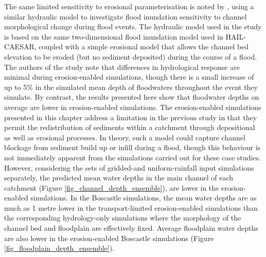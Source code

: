 The same limited sensitivity to erosional parameterisation is noted by \citep{wong2015sensitivity}, using a similar hydraulic model to investigate flood inundation sensitivity to channel morphological change during flood events. The hydraulic model used in the \citet{wong2015sensitivity} study is based on the same two-dimensional flood inundation model used in HAIL-CAESAR, coupled with a simple erosional model that allows the channel bed elevation to be eroded (but no sediment deposited) during the course of a flood. The authors of the study note that differences in hydrological response are minimal during erosion-enabled simulations, though there is a small increase of up to 5\% in the simulated mean depth of floodwaters throughout the event they simulate. By contrast, the results presented here show that floodwater depths on average are lower in erosion-enabled simulations. The erosion-enabled simulations presented in this chapter address a limitation in the previous study in that they permit the redistribution of sediments within a catchment through depositional as well as erosional processes.  In theory, such a model could capture channel blockage from sediment build up or infill during a flood, though this behaviour is not immediately apparent from the simulations carried out for these case studies. However, considering the sets of gridded-and uniform-rainfall input simulations separately, the predicted mean water depths in the main channel of each catchment (Figure \ref{fig_channel_depth_ensemble}), are lower in the erosion-enabled simulations. In the Boscastle simulations, the mean water depths are as much as 1 metre lower in the transport-limited erosion-enabled simulations than the corresponding hydrology-only simulations where the morphology of the channel bed and floodplain are effectively fixed. Average floodplain water depths are also lower in the erosion-enabled Boscastle simulations (Figure \ref{fig_floodplain_depth_ensemble}). 

